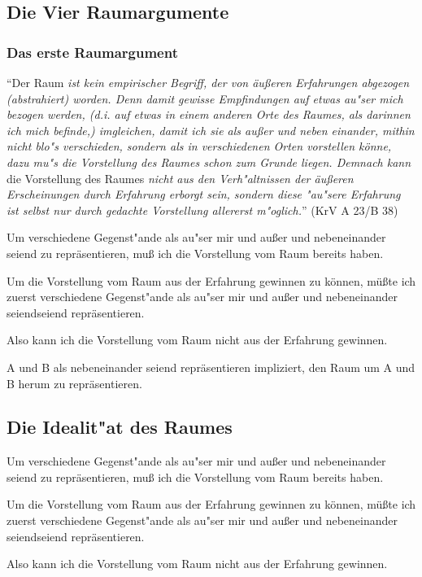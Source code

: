 \documentclass[emulatestandardclasses]{scrartcl}
\begin{document}
\subsection{Die Vier Raumargumente}

\subsubsection{Das erste Raumargument}

"`Der Raum \emph{ist kein empirischer Begriff, der von äußeren Erfahrungen abgezogen (abstrahiert) worden. Denn damit gewisse Empfindungen auf etwas au"ser mich bezogen werden, (d.i. auf etwas in einem anderen Orte des Raumes, als darinnen ich mich befinde,) imgleichen, damit ich sie als außer und neben einander, mithin nicht blo"s verschieden, sondern als in verschiedenen Orten vorstellen könne, dazu mu"s die Vorstellung des Raumes schon zum Grunde liegen. Demnach kann} die Vorstellung des Raumes \emph{nicht aus den Verh"altnissen der äußeren Erscheinungen durch Erfahrung erborgt sein, sondern diese "au"sere Erfahrung ist selbst nur durch gedachte Vorstellung allererst m"oglich.}"' (KrV A 23/B 38)

\begin{description}[leftmargin=!,labelwidth=\widthof{\bfseries P2}]
  \item[P1] Um verschiedene Gegenst"ande als au"ser mir und außer und nebeneinander seiend zu repräsentieren, muß ich die Vorstellung vom Raum bereits haben.
  \item[P2] Um die Vorstellung vom Raum aus der Erfahrung gewinnen zu können, müßte ich zuerst verschiedene Gegenst"ande als au"ser mir und außer und nebeneinander seiendseiend repräsentieren.
  \item[K] Also kann ich die Vorstellung vom Raum nicht aus der Erfahrung gewinnen.
\end{description}

A und B als nebeneinander seiend repräsentieren impliziert, den Raum um A und B herum zu repräsentieren.	

\subsection{Die Idealit"at des Raumes}

\begin{description}[leftmargin=!,labelwidth=\widthof{\bfseries P2}]
  \item[P1] Um verschiedene Gegenst"ande als au"ser mir und außer und nebeneinander seiend zu repräsentieren, muß ich die Vorstellung vom Raum bereits haben.
  \item[P2] Um die Vorstellung vom Raum aus der Erfahrung gewinnen zu können, müßte ich zuerst verschiedene Gegenst"ande als au"ser mir und außer und nebeneinander seiendseiend repräsentieren.
  \item[K] Also kann ich die Vorstellung vom Raum nicht aus der Erfahrung gewinnen.
\end{description}




\end{document}
